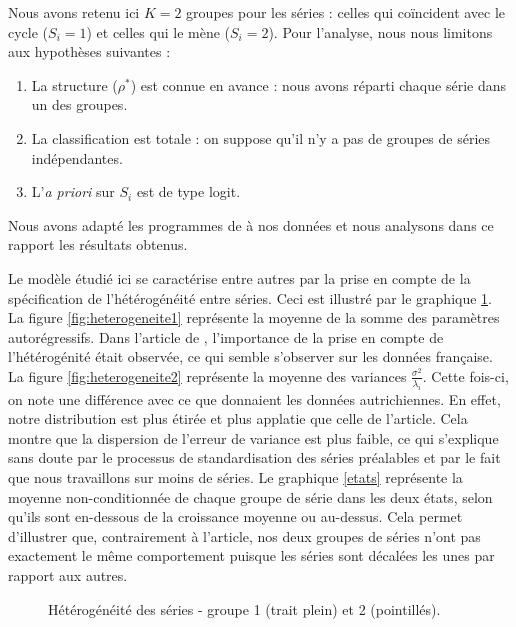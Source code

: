 \documentclass[10pt,french,french]{article}
\begin{document}
Nous avons retenu ici \(K=2\) groupes pour les séries : celles qui coïncident avec le cycle (\(S_i = 1\)) et celles qui le mène (\(S_i = 2\)).
Pour l'analyse, nous nous limitons aux hypothèses suivantes :

\begin{enumerate}
\def\labelenumi{\arabic{enumi}.}
\item
  La structure (\(\rho^*\)) est connue en avance : nous avons réparti chaque série dans un des groupes.
\item
  La classification est totale : on suppose qu'il n'y a pas de groupes de séries indépendantes.
\item
  L'\emph{a priori} sur \(S_i\) est de type logit.
\end{enumerate}

Nous avons adapté les programmes de \cite{Kaufmann} à nos données et nous analysons dans ce rapport les résultats obtenus.

Le modèle étudié ici se caractérise entre autres par la prise en compte de la spécification de l'hétérogénéité entre séries.
Ceci est illustré par le graphique \ref{heterogeneite}.
La figure \ref{fig:heterogeneite1} représente la moyenne de la somme des paramètres autorégressifs.
Dans l'article de \cite{Kaufmann}, l'importance de la prise en compte de l'hétérogénité était observée, ce qui semble s'observer sur les données française.
La figure \ref{fig:heterogeneite2} représente la moyenne des variances \(\frac{\sigma^2}{\lambda_i}\).
Cette fois-ci, on note une différence avec ce que donnaient les données autrichiennes.
En effet, notre distribution est plus étirée et plus applatie que celle de l'article.
Cela montre que la dispersion de l'erreur de variance est plus faible, ce qui s'explique sans doute par le processus de standardisation des séries préalables et par le fait que nous travaillons sur moins de séries.
Le graphique \ref{etats} représente la moyenne non-conditionnée de chaque groupe de série dans les deux états, selon qu'ils sont en-dessous de la croissance moyenne ou au-dessus.
Cela permet d'illustrer que, contrairement à l'article, nos deux groupes de séries n'ont pas exactement le même comportement puisque les séries sont décalées les unes par rapport aux autres.

\begin{figure}[htb]
\caption{Hétérogénéité des séries - groupe 1 (trait plein) et 2 (pointillés).}
\label{heterogeneite}
\end{figure}
\end{document}
